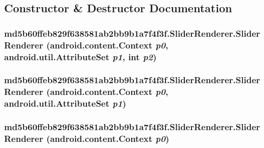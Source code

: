 \subsection{Constructor \& Destructor Documentation}
\hypertarget{classmd5b60ffeb829f638581ab2bb9b1a7f4f3f_1_1_slider_renderer_c4a155c9357e2f48baece33e8590b462}{
\subsubsection[{SliderRenderer}]{\setlength{\rightskip}{0pt plus 5cm}md5b60ffeb829f638581ab2bb9b1a7f4f3f.SliderRenderer.SliderRenderer (android.content.Context {\em p0}, \/  android.util.AttributeSet {\em p1}, \/  int {\em p2})}}
\label{classmd5b60ffeb829f638581ab2bb9b1a7f4f3f_1_1_slider_renderer_c4a155c9357e2f48baece33e8590b462}


\hypertarget{classmd5b60ffeb829f638581ab2bb9b1a7f4f3f_1_1_slider_renderer_a6d32149e1dbf9076af62a46ae72331f}{
\subsubsection[{SliderRenderer}]{\setlength{\rightskip}{0pt plus 5cm}md5b60ffeb829f638581ab2bb9b1a7f4f3f.SliderRenderer.SliderRenderer (android.content.Context {\em p0}, \/  android.util.AttributeSet {\em p1})}}
\label{classmd5b60ffeb829f638581ab2bb9b1a7f4f3f_1_1_slider_renderer_a6d32149e1dbf9076af62a46ae72331f}


\hypertarget{classmd5b60ffeb829f638581ab2bb9b1a7f4f3f_1_1_slider_renderer_fe6177683ec0ebd537f6aa0d703bf526}{
\subsubsection[{SliderRenderer}]{\setlength{\rightskip}{0pt plus 5cm}md5b60ffeb829f638581ab2bb9b1a7f4f3f.SliderRenderer.SliderRenderer (android.content.Context {\em p0})}}
\label{classmd5b60ffeb829f638581ab2bb9b1a7f4f3f_1_1_slider_renderer_fe6177683ec0ebd537f6aa0d703bf526}




